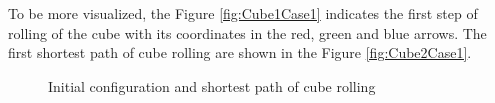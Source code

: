 \noindent To be more visualized, the Figure \ref{fig:Cube1Case1} indicates the first step of rolling of the cube with its coordinates in the red, green and blue arrows. The first shortest path of cube rolling are shown in the Figure \ref{fig:Cube2Case1}. 

\begin{center}
\begin{figure}[H]
\hfill
\caption{Initial configuration and shortest path of cube rolling}
\end{figure}
\end{center}



